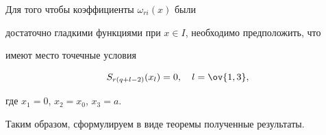  


\begin{notenonum} Для того чтобы коэффициенты $\omega_{ri}(x)$ были 


достаточно гладкими функциями при $x\in I$, необходимо предположить, что 


имеют место точечные условия 


\begin{equation} 


S_{r(q+l-2)}(x_l)=0,\quad l=\ov{1,3}, 


\end{equation} 


где $x_1=0$, $x_2=x_0$, $x_3=a$. 


\end{notenonum} 


 


Таким образом, сформулируем в виде теоремы полученные результаты. 


 


